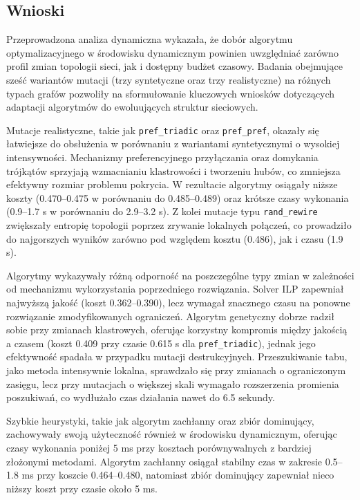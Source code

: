 \subsection{Wnioski}
Przeprowadzona analiza dynamiczna wykazała, że dobór algorytmu optymalizacyjnego w środowisku dynamicznym powinien uwzględniać zarówno profil zmian topologii sieci, jak i dostępny budżet czasowy. Badania obejmujące sześć wariantów mutacji (trzy syntetyczne oraz trzy realistyczne) na różnych typach grafów pozwoliły na sformułowanie kluczowych wniosków dotyczących adaptacji algorytmów do ewoluujących struktur sieciowych.

Mutacje realistyczne, takie jak \texttt{pref\_triadic} oraz \texttt{pref\_pref}, okazały się łatwiejsze do obsłużenia w porównaniu z wariantami syntetycznymi o wysokiej intensywności. Mechanizmy preferencyjnego przyłączania oraz domykania trójkątów sprzyjają wzmacnianiu klastrowości i tworzeniu hubów, co zmniejsza efektywny rozmiar problemu pokrycia. W rezultacie algorytmy osiągały niższe koszty (0.470--0.475 w porównaniu do 0.485--0.489) oraz krótsze czasy wykonania (0.9--1.7 s w porównaniu do 2.9--3.2 s). Z kolei mutacje typu \texttt{rand\_rewire} zwiększały entropię topologii poprzez zrywanie lokalnych połączeń, co prowadziło do najgorszych wyników zarówno pod względem kosztu (0.486), jak i czasu (1.9 s).

Algorytmy wykazywały różną odporność na poszczególne typy zmian w zależności od mechanizmu wykorzystania poprzedniego rozwiązania. Solver ILP zapewniał najwyższą jakość (koszt 0.362--0.390), lecz wymagał znacznego czasu na ponowne rozwiązanie zmodyfikowanych ograniczeń. Algorytm genetyczny dobrze radził sobie przy zmianach klastrowych, oferując korzystny kompromis między jakością a czasem (koszt 0.409 przy czasie 0.615 s dla \texttt{pref\_triadic}), jednak jego efektywność spadała w przypadku mutacji destrukcyjnych. Przeszukiwanie tabu, jako metoda intensywnie lokalna, sprawdzało się przy zmianach o ograniczonym zasięgu, lecz przy mutacjach o większej skali wymagało rozszerzenia promienia poszukiwań, co wydłużało czas działania nawet do 6.5 sekundy.

Szybkie heurystyki, takie jak algorytm zachłanny oraz zbiór dominujący, zachowywały swoją użyteczność również w środowisku dynamicznym, oferując czasy wykonania poniżej 5 ms przy kosztach porównywalnych z bardziej złożonymi metodami. Algorytm zachłanny osiągał stabilny czas w zakresie 0.5--1.8 ms przy koszcie 0.464--0.480, natomiast zbiór dominujący zapewniał nieco niższy koszt przy czasie około 5 ms.

